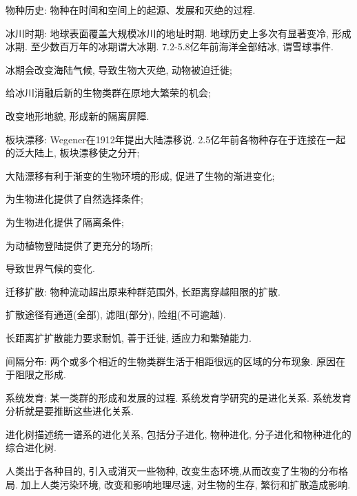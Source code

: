 \documentclass{ctexart}
\begin{document}
\begin{cenum}
    \item 物种历史: 物种在时间和空间上的起源、发展和灭绝的过程.
    \item 冰川时期: 地球表面覆盖大规模冰川的地址时期. 地球历史上多次有显著变冷, 形成冰期. 至少数百万年的冰期谓大冰期. 7.2-5.8亿年前海洋全部结冰, 谓雪球事件.
    \begin{cenum}
        \item 冰期会改变海陆气候, 导致生物大灭绝, 动物被迫迁徙;
        \item 给冰川消融后新的生物类群在原地大繁荣的机会;
        \item 改变地形地貌, 形成新的隔离屏障.
    \end{cenum}
    \item 板块漂移: Wegener在1912年提出大陆漂移说. 2.5亿年前各物种存在于连接在一起的泛大陆上, 板块漂移使之分开;
    \begin{cenum}
        \item 大陆漂移有利于渐变的生物环境的形成, 促进了生物的渐进变化;
        \item 为生物进化提供了自然选择条件;
        \item 为生物进化提供了隔离条件;
        \item 为动植物登陆提供了更充分的场所;
        \item 导致世界气候的变化.
    \end{cenum}
    \item 迁移扩散: 物种流动超出原来种群范围外, 长距离穿越阻限的扩散.
    \begin{cenum}
        \item 扩散途径有通道(全部), 滤阻(部分), 险组(不可逾越).
        \item 长距离扩扩散能力要求耐饥, 善于迁徙, 适应力和繁殖能力.
        \item 间隔分布: 两个或多个相近的生物类群生活于相距很远的区域的分布现象. 原因在于阻限之形成.
    \end{cenum}
    \item 系统发育: 某一类群的形成和发展的过程. 系统发育学研究的是进化关系. 系统发育分析就是要推断这些进化关系.
    \begin{cenum}
        \item 进化树描述统一谱系的进化关系, 包括分子进化, 物种进化, 分子进化和物种进化的综合进化树.
    \end{cenum}
    \item 人类出于各种目的, 引入或消灭一些物种, 改变生态环境,从而改变了生物的分布格局. 加上人类污染环境, 改变和影响地理尽速, 对生物的生存, 繁衍和扩散造成影响.
\end{cenum}
\end{document}
